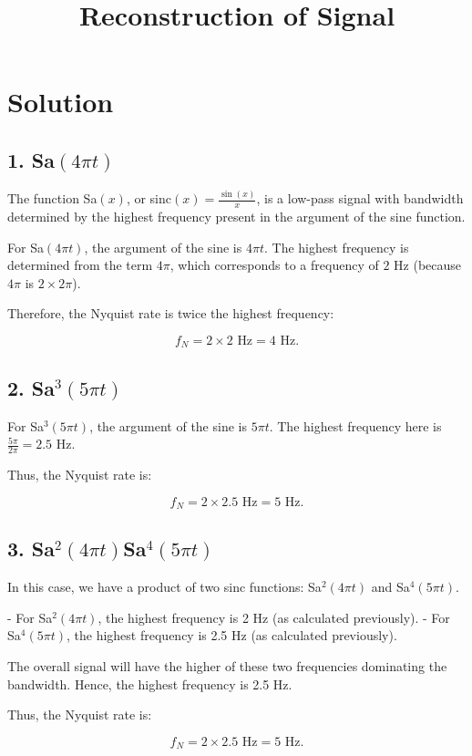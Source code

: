 \documentclass[12pt,a4paper]{report}
\begin{document}
\section*{Solution}

\subsection*{1. Sa$(4\pi t)$}
The function Sa$(x)$, or sinc$(x) = \frac{\sin(x)}{x}$, is a low-pass signal with bandwidth determined by the highest frequency present in the argument of the sine function.

For Sa$(4\pi t)$, the argument of the sine is $4\pi t$. The highest frequency is determined from the term $4\pi$, which corresponds to a frequency of $2$ Hz (because $4\pi$ is $2 \times 2\pi$).

Therefore, the Nyquist rate is twice the highest frequency:

\[
f_N = 2 \times 2 \text{ Hz} = 4 \text{ Hz}.
\]

\subsection*{2. Sa$^3(5\pi t)$}
For Sa$^3(5\pi t)$, the argument of the sine is $5\pi t$. The highest frequency here is $\frac{5\pi}{2\pi} = 2.5$ Hz.

Thus, the Nyquist rate is:

\[
f_N = 2 \times 2.5 \text{ Hz} = 5 \text{ Hz}.
\]

\subsection*{3. Sa$^2(4\pi t)$Sa$^4(5\pi t)$}
In this case, we have a product of two sinc functions: Sa$^2(4\pi t)$ and Sa$^4(5\pi t)$. 

- For Sa$^2(4\pi t)$, the highest frequency is 2 Hz (as calculated previously).
- For Sa$^4(5\pi t)$, the highest frequency is 2.5 Hz (as calculated previously).

The overall signal will have the higher of these two frequencies dominating the bandwidth. Hence, the highest frequency is 2.5 Hz.

Thus, the Nyquist rate is:

\[
f_N = 2 \times 2.5 \text{ Hz} = 5 \text{ Hz}.
\]


\title{\Huge \textbf{Reconstruction of Signal}} 
\date{} %
\maketitle
\end{document}
